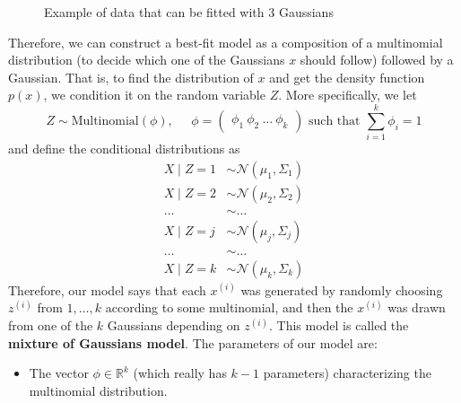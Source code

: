 \begin{figure}[H]
    \caption{Example of data that can be fitted with 3 Gaussians}
  \end{figure}

  \begin{definition}
    Therefore, we can construct a best-fit model as a composition of a multinomial distribution (to decide which one of the Gaussians $x$ should follow) followed by a Gaussian. That is, to find the distribution of $x$ and get the density function $p(x)$, we condition it on the random variable $Z$. More specifically, we let
    \begin{equation}
      Z \sim \text{Multinomial}(\phi), \;\;\;\;\; \phi = \begin{pmatrix} \phi_1 \ \phi_2 \ \ldots \ \phi_k \end{pmatrix} \text{ such that } \sum_{i=1}^k \phi_i = 1
    \end{equation}
    and define the conditional distributions as
    \begin{align*}
      X \mid Z = 1 & \sim \mathcal{N}(\mu_1, \Sigma_1) \\
      X \mid Z = 2 & \sim \mathcal{N}(\mu_2, \Sigma_2) \\
      \ldots & \sim \ldots \\
      X \mid Z = j & \sim \mathcal{N}(\mu_j, \Sigma_j) \\
      \ldots & \sim \ldots \\
      X \mid Z = k & \sim \mathcal{N}(\mu_k, \Sigma_k)
    \end{align*}
    Therefore, our model says that each $x^{(i)}$ was generated by randomly choosing $z^{(i)}$ from ${1, \ldots, k}$ according to some multinomial, and then the $x^{(i)}$ was drawn from one of the $k$ Gaussians depending on $z^{(i)}$. This model is called the \textbf{mixture of Gaussians model}. The parameters of our model are: 
    \begin{itemize}
      \item The vector $\phi \in \mathbb{R}^k$ (which really has $k-1$ parameters) characterizing the multinomial distribution.

\end{itemize}
\end{definition}
